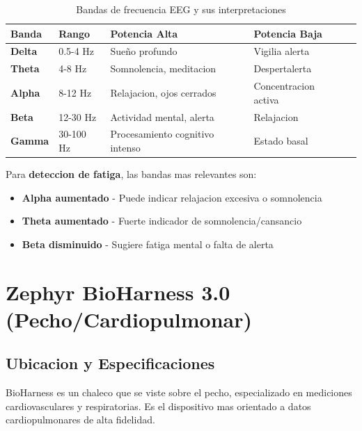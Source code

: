 \begin{table}[H]
\centering
\caption{Bandas de frecuencia EEG y sus interpretaciones}
\begin{tabular}{|l|l|l|l|l|}
\hline
\textbf{Banda} & \textbf{Rango} & \textbf{Potencia Alta} & \textbf{Potencia Baja} \\
\hline
\textbf{Delta} & 0.5-4 Hz & Sueño profundo & Vigilia alerta \\
\hline
\textbf{Theta} & 4-8 Hz & Somnolencia, meditacion & Despertalerta \\
\hline
\textbf{Alpha} & 8-12 Hz & Relajacion, ojos cerrados & Concentracion activa \\
\hline
\textbf{Beta} & 12-30 Hz & Actividad mental, alerta & Relajacion \\
\hline
\textbf{Gamma} & 30-100 Hz & Procesamiento cognitivo intenso & Estado basal \\
\hline
\end{tabular}
\end{table}

Para \textbf{deteccion de fatiga}, las bandas mas relevantes son:
\begin{itemize}
    \item \textbf{Alpha aumentado} - Puede indicar relajacion excesiva o somnolencia
    \item \textbf{Theta aumentado} - Fuerte indicador de somnolencia/cansancio
    \item \textbf{Beta disminuido} - Sugiere fatiga mental o falta de alerta
\end{itemize}

\section{Zephyr BioHarness 3.0 (Pecho/Cardiopulmonar)}

\subsection{Ubicacion y Especificaciones}

BioHarness es un chaleco que se viste sobre el pecho, especializado en mediciones
cardiovasculares y respiratorias. Es el dispositivo mas orientado a datos cardiopulmonares
de alta fidelidad.

